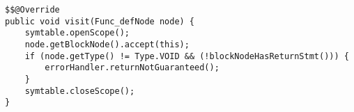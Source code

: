 \begin{lstlisting}[caption={Visit for a function declaration node in the Missing return statement visitor.}, label={code:MISRE:funcdef}]
$$@Override
public void visit(Func_defNode node) {
    symtable.openScope();
    node.getBlockNode().accept(this);
    if (node.getType() != Type.VOID && (!blockNodeHasReturnStmt())) {
        errorHandler.returnNotGuaranteed();
    }
    symtable.closeScope();
}
\end{lstlisting}